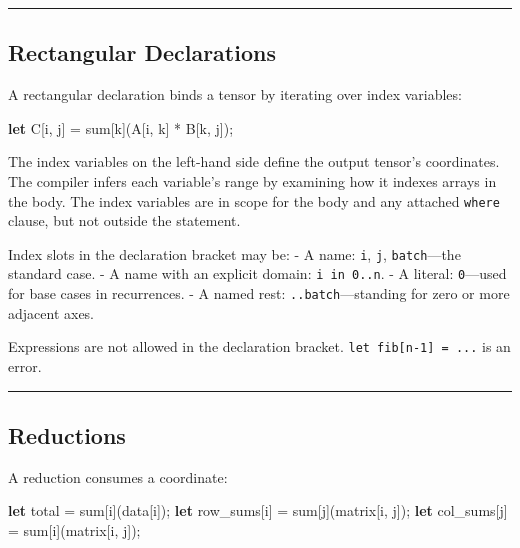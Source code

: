 \documentclass[11pt,]{article}
\newenvironment{Shaded}{}{}
\newcommand{\KeywordTok}[1]{\textcolor[rgb]{0.00,0.44,0.13}{\textbf{#1}}}
\newcommand{\NormalTok}[1]{#1}
\newcommand{\OperatorTok}[1]{\textcolor[rgb]{0.40,0.40,0.40}{#1}}
\begin{document}
\begin{center}\rule{0.5\linewidth}{0.4pt}\end{center}

\hypertarget{rectangular-declarations-1}{%
\subsection{Rectangular Declarations}\label{rectangular-declarations-1}}

A rectangular declaration binds a tensor by iterating over index
variables:

\begin{Shaded}
\begin{Highlighting}[]
\KeywordTok{let}\NormalTok{ C}\OperatorTok{[}\NormalTok{i, j}\OperatorTok{]}\NormalTok{ = sum}\OperatorTok{[}\NormalTok{k}\OperatorTok{]}\NormalTok{(A}\OperatorTok{[}\NormalTok{i, k}\OperatorTok{]}\NormalTok{ * B}\OperatorTok{[}\NormalTok{k, j}\OperatorTok{]}\NormalTok{);}
\end{Highlighting}
\end{Shaded}

The index variables on the left-hand side define the output tensor's
coordinates. The compiler infers each variable's range by examining how
it indexes arrays in the body. The index variables are in scope for the
body and any attached \texttt{where} clause, but not outside the
statement.

Index slots in the declaration bracket may be: - A name: \texttt{i},
\texttt{j}, \texttt{batch}---the standard case. - A name with an
explicit domain: \texttt{i\ in\ 0..n}. - A literal: \texttt{0}---used
for base cases in recurrences. - A named rest:
\texttt{..batch}---standing for zero or more adjacent axes.

Expressions are not allowed in the declaration bracket.
\texttt{let\ fib{[}n-1{]}\ =\ ...} is an error.

\begin{center}\rule{0.5\linewidth}{0.4pt}\end{center}

\hypertarget{reductions}{%
\subsection{Reductions}\label{reductions}}

A reduction consumes a coordinate:

\begin{Shaded}
\begin{Highlighting}[]
\KeywordTok{let}\NormalTok{ total = sum}\OperatorTok{[}\NormalTok{i}\OperatorTok{]}\NormalTok{(data}\OperatorTok{[}\NormalTok{i}\OperatorTok{]}\NormalTok{);}
\KeywordTok{let}\NormalTok{ row_sums}\OperatorTok{[}\NormalTok{i}\OperatorTok{]}\NormalTok{ = sum}\OperatorTok{[}\NormalTok{j}\OperatorTok{]}\NormalTok{(matrix}\OperatorTok{[}\NormalTok{i, j}\OperatorTok{]}\NormalTok{);}
\KeywordTok{let}\NormalTok{ col_sums}\OperatorTok{[}\NormalTok{j}\OperatorTok{]}\NormalTok{ = sum}\OperatorTok{[}\NormalTok{i}\OperatorTok{]}\NormalTok{(matrix}\OperatorTok{[}\NormalTok{i, j}\OperatorTok{]}\NormalTok{);}
\end{Highlighting}
\end{Shaded}
\end{document}
